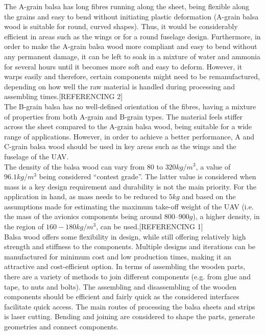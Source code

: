 \documentclass[12pt]{article}
\begin{document}
\noindent The A-grain balsa has long fibres running along the sheet, being flexible along the grains and easy to bend without initiating plastic deformation (A-grain balsa wood is suitable for round, curved shapes). Thus, it would be considerably efficient in areas such as the wings or for a round fuselage design. Furthermore, in order to make the A-grain balsa wood more compliant and easy to bend without any permanent damage, it can be left to soak in a mixture of water and ammonia for several hours until it becomes more soft and easy to deform. However, it warps easily and therefore, certain components might need to be remanufactured, depending on how well the raw material is handled during processing and assembling times.[REFERENCING 2] \\

\noindent The B-grain balsa has no well-defined orientation of the fibres, having a mixture of properties from both A-grain and B-grain types. The material feels stiffer across the sheet compared to the A-grain balsa wood, being suitable for a wide range of applications. However, in order to achieve a better performance, A and C-grain balsa wood should be used in key areas such as the wings and the fuselage of the UAV. \\

\noindent The density of the balsa wood can vary from $80$ to $320kg/m^3$, a value of $96.1kg/m^3$ being considered “contest grade”. The latter value is considered when mass is a key design requirement and durability is not the main priority. For the application in hand, as mass needs to be reduced to $5kg$ and based on the assumptions made for estimating the maximum take-off weight of the UAV (i.e. the mass of the avionics components being around $800 – 900g$), a higher density, in the region of $160 - 180kg/m^3$, can be used.[REFERENCING 1] \\

\noindent Balsa wood offers some flexibility in design, while still offering relatively high strength and stiffness to the components. Multiple designs and iterations can be manufactured for minimum cost and low production times, making it an attractive and cost-efficient option. In terms of assembling the wooden parts, there are a variety of methods to join different components (e.g. from glue and tape, to nuts and bolts). The assembling and disassembling of the wooden components should be efficient and fairly quick as the considered interfaces facilitate quick access. The main routes of processing the balsa sheets and strips is laser cutting. Bending and joining are considered to shape the parts, generate geometries and connect components.\\
\end{document}
